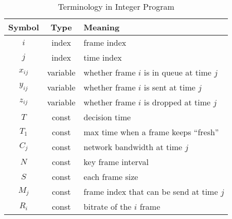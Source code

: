 \begin{table}[tb]
\footnotesize
\centering
\caption{Terminology in Integer Program}
\label{tbl:term}
{\setlength{\tabcolsep}{1pt}
\begin{tabular}{|c|c|l|}
\hline
\textbf{Symbol} & \textbf{Type} & \textbf{Meaning}                      \\ \hline
$i$               & index         & frame index                           \\ \hline
$j$               & index         & time index                            \\ \hline
$x_{ij}$             & variable      & whether frame $i$ is in queue at time $j$ \\ \hline
$y_{ij}$             & variable      & whether frame $i$ is sent at time $j$     \\ \hline
$z_{ij}$             & variable      & whether frame $i$ is dropped at time $j$  \\ \hline
$T$               & const         & decision time                        \\ \hline
$T_1$             & const       & max time when a frame keeps ``fresh'' \\ \hline
$C_j$              & const         & network bandwidth at time $j$           \\ \hline
$N$               & const         & key frame interval                      \\ \hline
$S$            & const         & each frame size                        \\ \hline
$M_{j}$       & const         & frame index that can be send at time $j$ \\ \hline
$R_{i}$        & const         & bitrate of the $i$ frame               \\ \hline
\end{tabular}}
\end{table}
